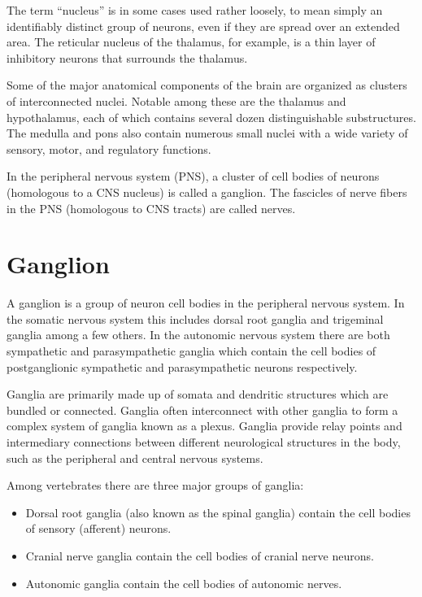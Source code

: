 The term ``nucleus'' is in some cases used rather loosely, to mean simply an identifiably distinct group of neurons, even if they are spread over an extended area. The reticular nucleus of the thalamus, for example, is a thin layer of inhibitory neurons that surrounds the thalamus.

Some of the major anatomical components of the brain are organized as clusters of interconnected nuclei. Notable among these are the thalamus and hypothalamus, each of which contains several dozen distinguishable substructures. The medulla and pons also contain numerous small nuclei with a wide variety of sensory, motor, and regulatory functions.

In the peripheral nervous system (PNS), a cluster of cell bodies of neurons (homologous to a CNS nucleus) is called a ganglion. The fascicles of nerve fibers in the PNS (homologous to CNS tracts) are called nerves.

\hypertarget{ganglion}{%
\section{Ganglion}\label{ganglion}}

A ganglion is a group of neuron cell bodies in the peripheral nervous system. In the somatic nervous system this includes dorsal root ganglia and trigeminal ganglia among a few others. In the autonomic nervous system there are both sympathetic and parasympathetic ganglia which contain the cell bodies of postganglionic sympathetic and parasympathetic neurons respectively.

Ganglia are primarily made up of somata and dendritic structures which are bundled or connected. Ganglia often interconnect with other ganglia to form a complex system of ganglia known as a plexus. Ganglia provide relay points and intermediary connections between different neurological structures in the body, such as the peripheral and central nervous systems.

Among vertebrates there are three major groups of ganglia:

\begin{itemize}
\tightlist
\item
  Dorsal root ganglia (also known as the spinal ganglia) contain the cell bodies of sensory (afferent) neurons.
\item
  Cranial nerve ganglia contain the cell bodies of cranial nerve neurons.
\item
  Autonomic ganglia contain the cell bodies of autonomic nerves.
\end{itemize}

